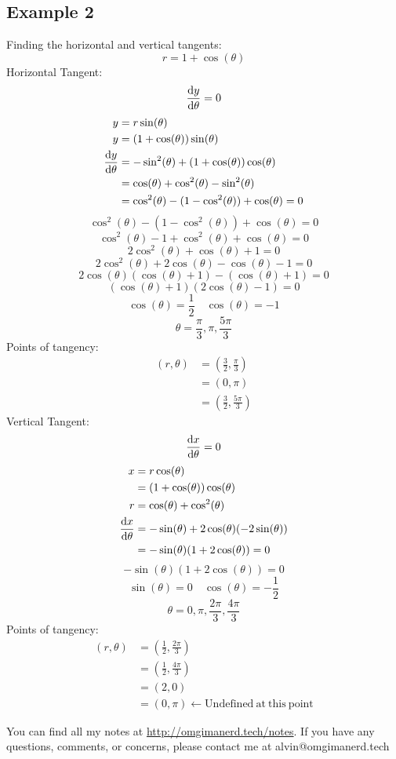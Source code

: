 \documentclass{math}
\begin{document}
\subsection*{Example 2}
Finding the horizontal and vertical tangents:
\[ r = 1+\cos(\theta) \]
Horizontal Tangent:
\[ \frac{\mathrm{d}{y}}{\mathrm{d}{\theta}} = 0 \]
\begin{align*}
  y &= r\sin(\theta) \\
  y &= (1+\cos(\theta))\sin(\theta) \\
  \frac{\mathrm{d}{y}}{\mathrm{d}{\theta}} &=
    -\sin^{2}(\theta)+(1+\cos(\theta))\cos(\theta) \\
  &= \cos(\theta)+\cos^{2}(\theta)-\sin^{2}(\theta) \\
  &= \cos^{2}(\theta)-(1-\cos^{2}(\theta))+\cos(\theta) = 0 \\
\end{align*}
\[ \cos^{2}(\theta)-(1-\cos^{2}(\theta))+\cos(\theta) = 0 \]
\[ \cos^{2}(\theta)-1+\cos^{2}(\theta)+\cos(\theta) = 0 \]
\[ 2\cos^{2}(\theta)+\cos(\theta)+1 = 0 \]
\[ 2\cos^{2}(\theta)+2\cos(\theta)-\cos(\theta)-1 = 0 \]
\[ 2\cos(\theta)(\cos(\theta)+1)-(\cos(\theta)+1) = 0 \]
\[ (\cos(\theta)+1)(2\cos(\theta)-1) = 0 \]
\[ \cos(\theta) = \frac{1}{2} \quad \cos(\theta) = -1 \]
\[ \theta = \frac{\pi}{3},\pi,\frac{5\pi}{3} \]
Points of tangency:
\begin{align*}
  (r,\theta) &= (\frac{3}{2},\frac{\pi}{3}) \\
  &= (0,\pi) \\
  &= (\frac{3}{2},\frac{5\pi}{3})
\end{align*}
Vertical Tangent:
\[ \frac{\mathrm{d}{x}}{\mathrm{d}{\theta}} = 0 \]
\begin{align*}
  x &= r\cos(\theta) \\
  &= (1+\cos(\theta))\cos(\theta) \\
  r &= \cos(\theta)+\cos^{2}(\theta) \\
  \frac{\mathrm{d}{x}}{\mathrm{d}{\theta}} &=
    -\sin(\theta)+2\cos(\theta)(-2\sin(\theta)) \\
  &= -\sin(\theta)(1+2\cos(\theta)) = 0
\end{align*}
\[ -\sin(\theta)(1+2\cos(\theta)) = 0 \]
\[ \sin(\theta) = 0 \quad \cos(\theta) = -\frac{1}{2} \]
\[ \theta = 0,\pi,\frac{2\pi}{3},\frac{4\pi}{3} \]
Points of tangency:
\begin{align*}
  (r,\theta) &= (\frac{1}{2},\frac{2\pi}{3}) \\
  &= (\frac{1}{2},\frac{4\pi}{3}) \\
  &= (2,0) \\
  &= (0,\pi) \leftarrow \mathrm{Undefined\ at\ this\ point}
\end{align*}

\begin{center}
  You can find all my notes at \url{http://omgimanerd.tech/notes}. If you have
  any questions, comments, or concerns, please contact me at
  alvin@omgimanerd.tech
\end{center}
\end{document}
